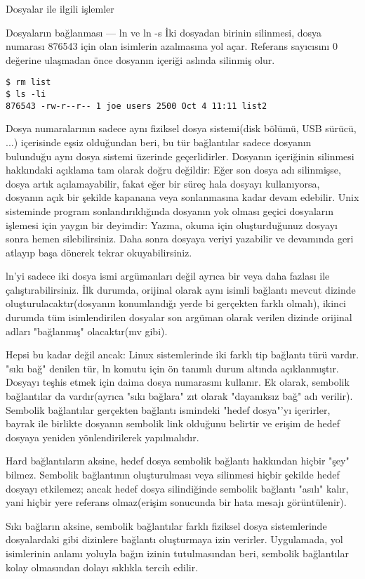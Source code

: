 \begin{section}{Dosyalar ile ilgili işlemler}
\begin{subsection}{Dosyaların bağlanması — ln ve ln -s}
İki dosyadan birinin silinmesi, dosya numarası 876543 için olan isimlerin azalmasına yol açar. Referans sayıcısını 0 değerine ulaşmadan önce dosyanın içeriği aslında silinmiş olur.
\begin{verbatim}
$ rm list
$ ls -li
876543 -rw-r--r-- 1 joe users 2500 Oct 4 11:11 list2
\end{verbatim}
Dosya numaralarının sadece aynı fiziksel dosya sistemi(disk bölümü, USB sürücü, ...) içerisinde eşsiz olduğundan beri, bu tür bağlantılar sadece dosyanın bulunduğu aynı dosya sistemi üzerinde geçerlidirler.
Dosyanın içeriğinin silinmesi hakkındaki açıklama tam olarak doğru değildir: Eğer son dosya adı silinmişse, dosya artık açılamayabilir, fakat eğer bir süreç hala dosyayı kullanıyorsa, dosyanın açık bir şekilde kapanana veya sonlanmasına kadar devam edebilir. Unix sisteminde program sonlandırıldığında dosyanın yok olması geçici dosyaların işlemesi için yaygın bir deyimdir: Yazma, okuma için oluşturduğunuz dosyayı sonra hemen silebilirsiniz. Daha sonra dosyaya veriyi yazabilir ve devamında geri atlayıp başa dönerek tekrar okuyabilirsiniz.

ln'yi sadece iki dosya ismi argümanları değil ayrıca bir veya daha fazlası ile çalıştırabilirsiniz. İlk durumda, orijinal olarak aynı isimli bağlantı mevcut dizinde oluşturulacaktır(dosyanın konumlandığı yerde bi gerçekten farklı olmalı), ikinci durumda tüm isimlendirilen dosyalar son argüman olarak verilen dizinde orijinal adları "bağlanmış" olacaktır(mv gibi).

Hepsi bu kadar değil ancak: Linux sistemlerinde iki farklı tip bağlantı türü vardır. "sıkı bağ" denilen tür, ln komutu için ön tanımlı durum altında açıklanmıştır. Dosyayı teşhis etmek için daima dosya numarasını kullanır. Ek olarak, sembolik bağlantılar da vardır(ayrıca "sıkı bağlara" zıt olarak "dayanıksız bağ" adı verilir). Sembolik bağlantılar gerçekten  bağlantı ismindeki "hedef dosya"'yı içerirler, bayrak ile birlikte dosyanın sembolik link olduğunu belirtir ve erişim de hedef dosyaya yeniden yönlendirilerek yapılmalıdır.

Hard bağlantıların aksine, hedef dosya sembolik bağlantı hakkından hiçbir "şey" bilmez. Sembolik bağlantının oluşturulması veya silinmesi hiçbir şekilde hedef dosyayı etkilemez; ancak hedef dosya silindiğinde sembolik bağlantı "asılı" kalır, yani hiçbir yere referans olmaz(erişim sonucunda bir hata mesajı görüntülenir).

Sıkı bağların aksine, sembolik bağlantılar farklı fiziksel dosya sistemlerinde dosyalardaki gibi dizinlere bağlantı oluşturmaya izin verirler. Uygulamada, yol isimlerinin anlamı yoluyla bağın izinin tutulmasından beri, sembolik bağlantılar kolay olmasından dolayı sıklıkla tercih edilir.


\end{subsection}
\end{section}
